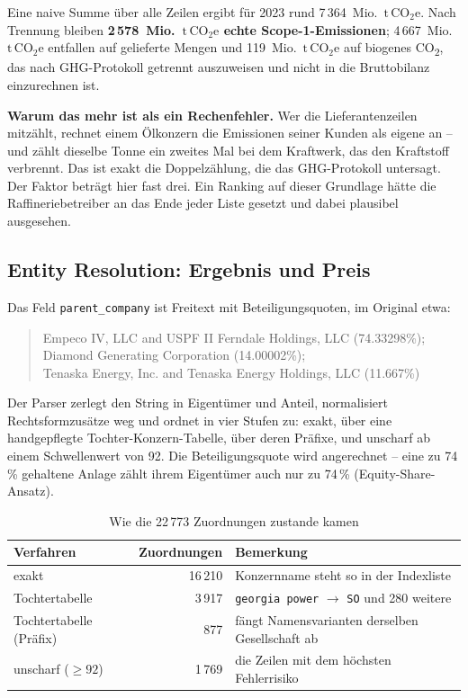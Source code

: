 \documentclass[11pt,a4paper]{article}
\newcommand{\tco}{\ensuremath{\mathrm{t\,CO}_{2}\mathrm{e}}}
\newcommand{\befund}[1]{%
  \par\vspace{2pt}\noindent\colorbox{softgrey}{%
  \begin{minipage}{\dimexpr\linewidth-2\fboxsep}\small\vspace{3pt}#1\vspace{3pt}\end{minipage}}\par\vspace{4pt}}
\begin{document}
Eine naive Summe über alle Zeilen ergibt für 2023 rund 7\,364~Mio.~\tco. Nach Trennung bleiben \textbf{2\,578~Mio.~\tco{} echte Scope-1-Emissionen}; 4\,667~Mio.~\tco{} entfallen auf gelieferte Mengen und 119~Mio.~\tco{} auf biogenes CO\textsubscript{2}, das nach GHG-Protokoll getrennt auszuweisen und nicht in die Bruttobilanz einzurechnen ist.

\befund{\textbf{Warum das mehr ist als ein Rechenfehler.} Wer die Lieferantenzeilen mitzählt, rechnet einem Ölkonzern die Emissionen seiner Kunden als eigene an -- und zählt dieselbe Tonne ein zweites Mal bei dem Kraftwerk, das den Kraftstoff verbrennt. Das ist exakt die Doppelzählung, die das GHG-Protokoll untersagt. Der Faktor beträgt hier fast drei. Ein Ranking auf dieser Grundlage hätte die Raffineriebetreiber an das Ende jeder Liste gesetzt und dabei plausibel ausgesehen.}

\subsection{Entity Resolution: Ergebnis und Preis}

Das Feld \texttt{parent\_company} ist Freitext mit Beteiligungsquoten, im Original etwa:

\begin{quote}\footnotesize\ttfamily\raggedright
Empeco IV, LLC and USPF II Ferndale Holdings, LLC (74.33298\%);\\
Diamond Generating Corporation (14.00002\%);\\
Tenaska Energy, Inc. and Tenaska Energy Holdings, LLC (11.667\%)
\end{quote}

Der Parser zerlegt den String in Eigentümer und Anteil, normalisiert Rechtsformzusätze weg und ordnet in vier Stufen zu: exakt, über eine handgepflegte Tochter-Konzern-Tabelle, über deren Präfixe, und unscharf ab einem Schwellenwert von 92. Die Beteiligungsquote wird angerechnet -- eine zu 74\,\% gehaltene Anlage zählt ihrem Eigentümer auch nur zu 74\,\% (Equity-Share-Ansatz).

\begin{table}[htbp]
\centering\small
\caption{Wie die 22\,773 Zuordnungen zustande kamen}
\label{tab:matching}
\begin{tabular}{lrl}
\toprule
\textbf{Verfahren} & \textbf{Zuordnungen} & \textbf{Bemerkung} \\
\midrule
exakt & 16\,210 & Konzernname steht so in der Indexliste \\
Tochtertabelle & 3\,917 & \texttt{georgia power} $\rightarrow$ \texttt{SO} und 280 weitere \\
Tochtertabelle (Präfix) & 877 & fängt Namensvarianten derselben Gesellschaft ab \\
unscharf ($\geq 92$) & 1\,769 & die Zeilen mit dem höchsten Fehlerrisiko \\
\bottomrule
\end{tabular}
\end{table}
\end{document}
